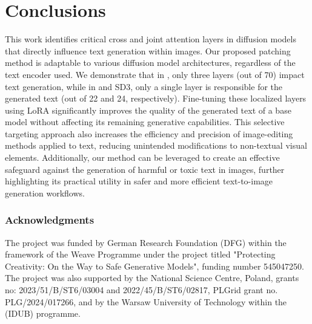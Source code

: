 \section{Conclusions}

This work identifies critical cross and joint attention layers in diffusion models that directly influence text generation within images. Our proposed patching method is adaptable to various diffusion model architectures, regardless of the text encoder used. We demonstrate that in \SDXL, only three layers (out of 70) impact text generation, while in \DeepFloyd and SD3, only a single layer is responsible for the generated text (out of 22 and 24, respectively).
Fine-tuning these localized layers using LoRA significantly improves the quality of the generated text of a base model without affecting its remaining generative capabilities. This selective targeting approach also increases the efficiency and precision of image-editing methods applied to text, reducing unintended modifications to non-textual visual elements.
Additionally, our method can be leveraged to create an effective safeguard against the generation of harmful or toxic text in images, further highlighting its practical utility in safer and more efficient text-to-image generation workflows.


\subsubsection*{Acknowledgments}
The project was funded by German Research Foundation (DFG) within the framework of the Weave Programme under the project titled "Protecting Creativity: On the Way to Safe Generative Models", funding number 545047250.
The project was also supported by the National Science Centre, Poland, grants no: 2023/51/B/ST6/03004 and 2022/45/B/ST6/02817, PLGrid grant no. PLG/2024/017266, and by the Warsaw University of Technology within the (IDUB) programme.




